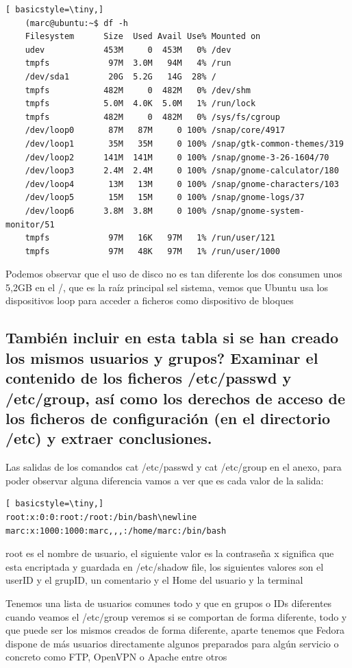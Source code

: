 \documentclass[preprint,11pt]{elsarticle}
\begin{document}
\begin{lstlisting}[ basicstyle=\tiny,]
    (marc@ubuntu:~$ df -h
    Filesystem      Size  Used Avail Use% Mounted on
    udev            453M     0  453M   0% /dev
    tmpfs            97M  3.0M   94M   4% /run
    /dev/sda1        20G  5.2G   14G  28% /
    tmpfs           482M     0  482M   0% /dev/shm
    tmpfs           5.0M  4.0K  5.0M   1% /run/lock
    tmpfs           482M     0  482M   0% /sys/fs/cgroup
    /dev/loop0       87M   87M     0 100% /snap/core/4917
    /dev/loop1       35M   35M     0 100% /snap/gtk-common-themes/319
    /dev/loop2      141M  141M     0 100% /snap/gnome-3-26-1604/70
    /dev/loop3      2.4M  2.4M     0 100% /snap/gnome-calculator/180
    /dev/loop4       13M   13M     0 100% /snap/gnome-characters/103
    /dev/loop5       15M   15M     0 100% /snap/gnome-logs/37
    /dev/loop6      3.8M  3.8M     0 100% /snap/gnome-system-monitor/51
    tmpfs            97M   16K   97M   1% /run/user/121
    tmpfs            97M   48K   97M   1% /run/user/1000

\end{lstlisting}
Podemos observar que el uso de disco no es tan diferente los dos consumen unos 5,2GB en el /, que es la raíz principal sel sistema, vemos que Ubuntu usa los dispositivos loop para acceder a ficheros como dispositivo de bloques 

\subsection{También incluir en esta tabla si se han creado los mismos usuarios y grupos? Examinar el contenido de los ficheros /etc/passwd y /etc/group, así como los derechos de acceso de los ficheros de configuración (en el directorio /etc) y extraer conclusiones.}

Las salidas de los comandos cat /etc/passwd y cat /etc/group en el anexo, para poder observar alguna diferencia vamos a ver que es cada valor de la salida:
\begin{lstlisting}[ basicstyle=\tiny,]
root:x:0:0:root:/root:/bin/bash\newline
marc:x:1000:1000:marc,,,:/home/marc:/bin/bash
\end{lstlisting}
root es el nombre de usuario, el siguiente valor es la contraseña x significa que esta encriptada y guardada en /etc/shadow file, los siguientes valores son el userID y el grupID, un comentario y el Home del usuario y la terminal

Tenemos una lista de usuarios comunes todo y que en grupos o IDs diferentes cuando veamos el /etc/group veremos si se comportan de forma diferente, todo y que puede ser los mismos creados de forma diferente, aparte tenemos que Fedora dispone de más usuarios directamente algunos preparados para algún servicio o concreto como FTP, OpenVPN o Apache entre otros
\end{document}
